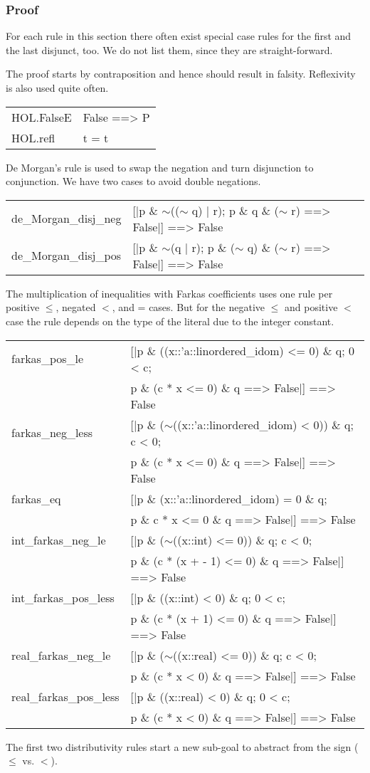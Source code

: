 \documentclass[10pt,a4paper]{article}
\newcommand{\negat}{\ensuremath{\sim}}
\newcommand{\nega}{\negat\xspace}
\newenvironment{pt}[1]{\begin{center}\begin{tt}\begin{tabular}{#1}\hline}{\end{tabular}\end{tt}\end{center}}
\newcommand{\pl}[1]{#1 \\[1mm]}
\newcommand{\pll}[1]{#1 \\\hline}
\def\ind{\quad}
\begin{document}
\subsubsection*{Proof}
For each rule in this section there often exist special case rules for the first and the last disjunct, too. We do not list them, since they are straight-forward.

\smallskip

The proof starts by contraposition and hence should result in falsity. Reflexivity is also used quite often.
%
\begin{pt}{ll}
	\pl{HOL.FalseE & False ==> P}
	\pll{HOL.refl & t = t}
\end{pt}

De Morgan's rule is used to swap the negation and turn disjunction to conjunction. We have two cases to avoid double negations.

\begin{pt}{ll}
	\pl{de\_Morgan\_disj\_neg & [|p \& \nega ((\nega q) | r); p \& q \& (\nega r) ==> False|] ==> False}
	\pll{de\_Morgan\_disj\_pos & [|p \& \nega(q | r); p \& (\nega q) \& (\nega r) ==> False|] ==> False}
\end{pt}

The multiplication of inequalities with Farkas coefficients uses one rule per positive $\leq$, negated $<$, and = cases. But for the negative $\leq$ and positive $<$ case the rule depends on the type of the literal due to the integer constant.
%
\begin{pt}{ll}
	\pl{farkas\_pos\_le & [|p \& ((x::'a::linordered\_idom) <= 0) \& q; 0 < c;}
		\pl{& \ind p \& (c * x <= 0) \& q ==> False|] ==> False}
	\pl{farkas\_neg\_less & [|p \& (\nega((x::'a::linordered\_idom) < 0)) \& q; c < 0;}
		\pl{& \ind p \& (c * x <= 0) \& q ==> False|] ==> False}
	\pl{farkas\_eq & [|p \& (x::'a::linordered\_idom) = 0 \& q;}
		\pl{& \ind p \& c * x <= 0 \& q ==> False|] ==> False}
	\pl{int\_farkas\_neg\_le & [|p \& (\nega((x::int) <= 0)) \& q; c < 0;}
		\pl{& \ind p \& (c * (x + - 1) <= 0) \& q ==> False|] ==> False}
	\pl{int\_farkas\_pos\_less & [|p \& ((x::int) < 0) \& q; 0 < c;}
		\pl{& \ind p \& (c * (x + 1) <= 0) \& q ==> False|] ==> False}
	\pl{real\_farkas\_neg\_le & [|p \& (\nega((x::real) <= 0)) \& q; c < 0;}
		\pl{& \ind p \& (c * x < 0) \& q ==> False|] ==> False}
	\pl{real\_farkas\_pos\_less & [|p \& ((x::real) < 0) \& q; 0 < c;}
		\pll{& \ind p \& (c * x < 0) \& q ==> False|] ==> False}
\end{pt}

The first two distributivity rules start a new sub-goal to abstract from the sign ($\leq$ vs. $<$).
\end{document}

